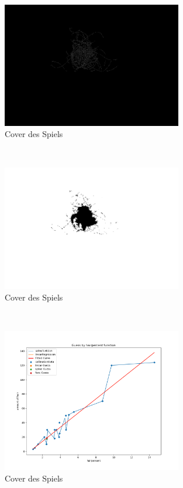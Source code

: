 \documentclass[german,a4paper,12pt,smallheadings,headsepline, titlepage, liststotoc, idextotoc,bibtoctoc,blibliography = totocnumbered]{scrartcl}
\begin{document}
\begin{figure}
	\centering
	\includegraphics[width=0.7\textwidth]{figBina/09input intensity.png}
	\caption[]{Cover des Spiels}
	\label{img:Bina01}
\end{figure}\\
\begin{figure}
	\centering
	\includegraphics[width=0.7\textwidth]{figBina/09outer section.png}
	\caption[]{Cover des Spiels}
	\label{img:Bina01}
\end{figure}\\
\begin{figure}
	\centering
	\includegraphics[width=0.7\textwidth]{figBina/g1.png}
	\caption[]{Cover des Spiels}
	\label{img:Bina01}
\end{figure}\\
\end{document}
